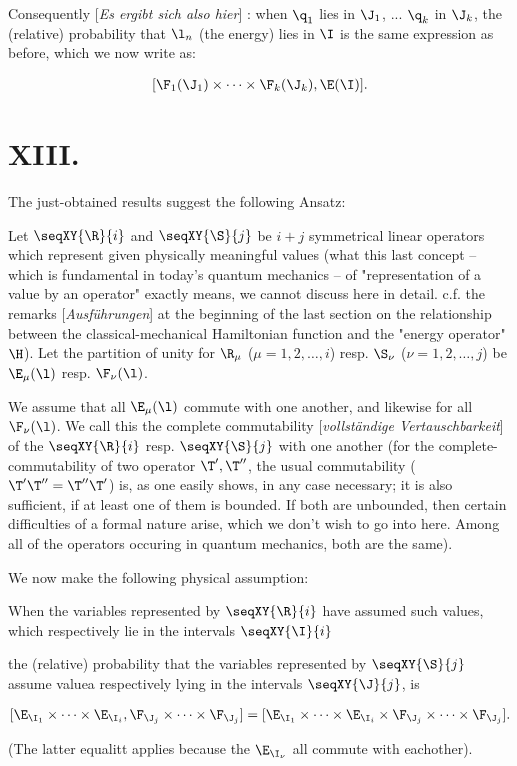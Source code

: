 \documentclass{article}
\newcommand{\WTF}[1]{
[\it{\small{#1}}]
}
\newcommand{\uequ}[1]{
\begin{align*}
#1
\end{align*}
}
\renewcommand{\it}[1]{\textit{#1}}
\begin{document}
Consequently\WTF{Es ergibt sich also hier}: when $\q_1$ lies in $\J_1$, ... $\q_k$ in $\J_k$, the (relative) probability that $\l_n$ (the energy) lies in $\I$ is the same expression as before, which we now write as:
\uequ{
[\F_1(\J_1)\times\dots\times\F_k(\J_k), \E(\I)].
}

\section*{XIII.}
The just-obtained results suggest the following Ansatz:

Let $\seqXY{\R}{i}$ and $\seqXY{\S}{j}$ be $i+j$ symmetrical linear operators which represent given physically meaningful values (what this last concept -- which is fundamental in today's quantum mechanics -- of "representation of a value by an operator" exactly means, we cannot discuss here in detail. c.f. the remarks\WTF{Ausführungen} at the beginning of the last section on the relationship between the classical-mechanical Hamiltonian function and the "energy operator" $\H$). Let the partition of unity for $\R_\mu$ ($\mu=1,2,\dots,i$) resp. $\S_\nu$ ($\nu=1,2,\dots,j$) be $\E_\mu(\l)$ resp. $\F_\nu(\l)$.

We assume that all $\E_\mu(\l)$ commute with one another, and likewise for all $\F_\nu(\l)$. We call this the complete commutability\WTF{vollständige Vertauschbarkeit} of the $\seqXY{\R}{i}$ resp. $\seqXY{\S}{j}$  with one another (for the complete-commutability of two operator $\T',\T''$, the usual commutability ($\T'\T''=\T''\T'$) is, as one easily shows, in any case necessary; it is also sufficient, if at least one of them is bounded. If both are unbounded, then certain difficulties of a formal nature arise, which we don't wish to go into here. Among all of the operators occuring in quantum mechanics, both are the same).

We now make the following physical assumption:

When the variables represented by $\seqXY{\R}{i}$ have assumed such values, which respectively lie in the intervals $\seqXY{\I}{i}$ 



 the (relative) probability that the variables represented by $\seqXY{\S}{j}$ assume valuea respectively lying in the intervals $\seqXY{\J}{j}$, is
\uequ{
[\E_{\I_1}\times\dots\times\E_{\I_i},\F_{\J_j}\times\dots\times\F_{\J_j}] = 
[\E_{\I_1}\times\dots\times\E_{\I_i}\times\F_{\J_j}\times\dots\times\F_{\J_j}].
}
(The latter equalitt applies because the $\E_{\I_\nu}$ all commute with eachother).
\end{document}
